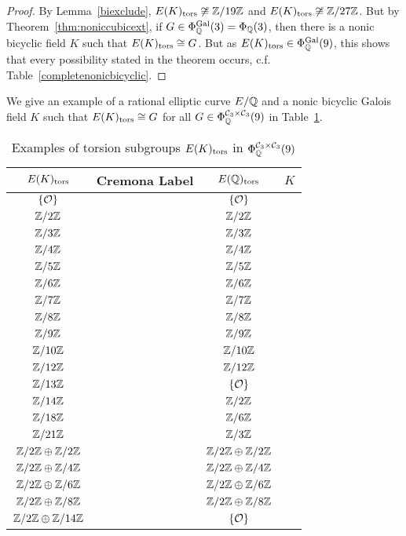 \begin{proof}
By Lemma~\ref{biexclude}, $E(K)_{\text{tors}} \not\cong \mathbb{Z}/19\mathbb{Z}$ and $E(K)_{\text{tors}} \not\cong \mathbb{Z}/27\mathbb{Z}$. But by Theorem~\ref{thm:noniccubicext}, if $G \in \Phi_{\mathbb{Q}}^{\operatorname{Gal}}(3)= \Phi_{\mathbb{Q}}(3)$, then there is a nonic bicyclic field $K$ such that $E(K)_{\text{tors}} \cong G$. But as $E(K)_{\text{tors}} \in \Phi_{\mathbb{Q}}^{\operatorname{Gal}}(9)$, this shows that every possibility stated in the theorem occurs, c.f. Table~\ref{completenonicbicyclic}.
\end{proof}


We give an example of a rational elliptic curve $E/\mathbb{Q}$ and a nonic bicyclic Galois field $K$ such that $E(K)_{\text{tors}} \cong G$ for all $G \in \Phi_{\mathbb{Q}}^{\mathcal{C}_3 \times \mathcal{C}_3}(9)$ in Table~\ref{tab:completenonicbicyclic}.


	\begin{table}[!ht] 
	\centering
	\caption{Examples of torsion subgroups $E(K)_{\text{tors}}$ in $\Phi_{\mathbb{Q}}^{\mathcal{C}_3 \times \mathcal{C}_3}(9)$\label{tab:completenonicbicyclic}}
	\begin{tabular}{cccc} \hline
	 $E(K)_{\text{tors}}$ & Cremona Label & $E(\mathbb{Q})_{\text{tors}}$ & $K$ \\ \hline
	$\{ \mathcal{O} \}$ & \ooat{} & $\{ \mathcal{O} \}$ & \nnstfttf{} \\
	$\mathbb{Z}/2\mathbb{Z}$ & \ffafiv{} & $\mathbb{Z}/2\mathbb{Z}$ & \nnstfttf{} \\
	$\mathbb{Z}/3\mathbb{Z}$ & \onao{} & $\mathbb{Z}/3\mathbb{Z}$ & \nnstfttf{} \\
	$\mathbb{Z}/4\mathbb{Z}$ & \ofas{} & $\mathbb{Z}/4\mathbb{Z}$ & \nnstfttf{} \\
	$\mathbb{Z}/5\mathbb{Z}$ & \ooao{} & $\mathbb{Z}/5\mathbb{Z}$ & \nnstfttf{} \\
	$\mathbb{Z}/6\mathbb{Z}$ & \ofat{} & $\mathbb{Z}/6\mathbb{Z}$ & \nnstfttf{} \\
	$\mathbb{Z}/7\mathbb{Z}$ & \tsbo{} & $\mathbb{Z}/7\mathbb{Z}$ & \nnstfttf{} \\
	$\mathbb{Z}/8\mathbb{Z}$ & \ffaf{} & $\mathbb{Z}/8\mathbb{Z}$ & \nnstfttf{} \\
	$\mathbb{Z}/9\mathbb{Z}$ & \ffbt{} & $\mathbb{Z}/9\mathbb{Z}$ & \nnstfttf{} \\
	$\mathbb{Z}/10\mathbb{Z}$ & \ssco{} & $\mathbb{Z}/10\mathbb{Z}$ & \nnstfttf{} \\
	$\mathbb{Z}/12\mathbb{Z}$ & \nzct{} & $\mathbb{Z}/12\mathbb{Z}$ & \nnstfttf{} \\
	$\mathbb{Z}/13\mathbb{Z}$ & \ofsbo{} & $\{ \mathcal{O} \}$ & \nnstfttf{} \\
	$\mathbb{Z}/14\mathbb{Z}$ & \fnaf{} & $\mathbb{Z}/2\mathbb{Z}$ & \nnstfttf{} \\
	$\mathbb{Z}/18\mathbb{Z}$ & \ofaf{} & $\mathbb{Z}/6\mathbb{Z}$ & \nnstfttf{} \\
	$\mathbb{Z}/21\mathbb{Z}$ & \ostbo{} & $\mathbb{Z}/3\mathbb{Z}$ & \qzetatsp{} \\
	$\mathbb{Z}/2\mathbb{Z} \oplus \mathbb{Z}/2\mathbb{Z}$ & \ffat{} & $\mathbb{Z}/2\mathbb{Z} \oplus \mathbb{Z}/2\mathbb{Z}$ & \nnstfttf{} \\
	$\mathbb{Z}/2\mathbb{Z} \oplus \mathbb{Z}/4\mathbb{Z}$ & \ffao{} & $\mathbb{Z}/2\mathbb{Z} \oplus \mathbb{Z}/4\mathbb{Z}$ & \nnstfttf{} \\
	$\mathbb{Z}/2\mathbb{Z} \oplus \mathbb{Z}/6\mathbb{Z}$ & \tzat{} & $\mathbb{Z}/2\mathbb{Z} \oplus \mathbb{Z}/6\mathbb{Z}$ & \nnstfttf{} \\
	$\mathbb{Z}/2\mathbb{Z} \oplus \mathbb{Z}/8\mathbb{Z}$ & \tozet{} & $\mathbb{Z}/2\mathbb{Z} \oplus \mathbb{Z}/8\mathbb{Z}$ & \nnstfttf{} \\
	$\mathbb{Z}/2\mathbb{Z} \oplus \mathbb{Z}/14\mathbb{Z}$ & \onttco{} & $\{ \mathcal{O} \}$ & \nnstfttfz{} \\
	\end{tabular}
	\end{table}





